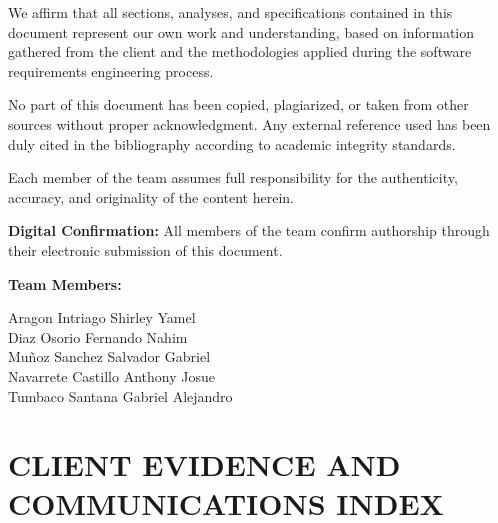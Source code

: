 \documentclass[letterpaper%
, oneside%
, 12pt%
, memoireprojet%
, english%
,creativecommons,hyperref, withAlgo2e %
]{thETS}
\begin{document}
We affirm that all sections, analyses, and specifications contained in this document represent our own work and understanding, based on information gathered from the client and the methodologies applied during the software requirements engineering process.

No part of this document has been copied, plagiarized, or taken from other sources without proper acknowledgment. Any external reference used has been duly cited in the bibliography according to academic integrity standards.

Each member of the team assumes full responsibility for the authenticity, accuracy, and originality of the content herein.

\vspace{1cm}

\noindent\textbf{Digital Confirmation:} All members of the team confirm authorship through their electronic submission of this document.

\vspace{1cm}

\noindent\textbf{Team Members:}

\vspace{0.3cm}
\noindent Aragon Intriago Shirley Yamel \\
Diaz Osorio Fernando Nahim \\
Muñoz Sanchez Salvador Gabriel \\
Navarrete Castillo Anthony Josue \\
Tumbaco Santana Gabriel Alejandro





\chapter{CLIENT EVIDENCE AND COMMUNICATIONS INDEX}
\end{document}
